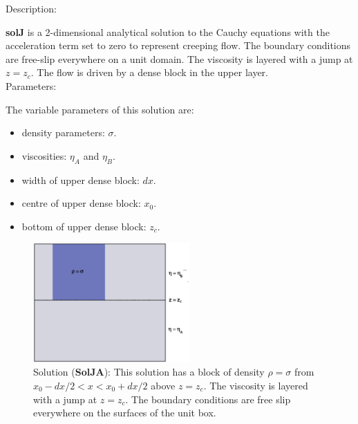   {\large \fontB Description:}
  
  {\bf solJ} is a 2-dimensional analytical solution to the Cauchy equations with the acceleration term set to zero
  to represent creeping flow. The boundary conditions are free-slip everywhere on a unit domain. 
  The viscosity is layered with a jump at $ z=z_c $.
  The flow is driven by a dense block in the upper layer.
  \\

  {\large \fontB Parameters:}
 
  The variable parameters of this solution are:
  \begin{itemize}
    \item{density parameters: $ \sigma $.}
    \item{viscosities: $\eta_A$ and $\eta_B$.}
    \item{width of upper dense block: $dx$.}
    \item{centre of upper dense block: $x_0$.}
    \item{bottom of upper dense block: $z_c$.}
    \end{itemize}

  \begin{figure}
    \includegraphics[width=6cm,clip]{../figs/figJA.eps}
    \caption[Short caption]{\label{figJA} 
      Solution ({\bf SolJA}):
      This solution has a block of density $\rho = \sigma$ from $x_{0}-dx/2 < x < x_{0}+dx/2$ above
      $ z= z_c$.
      The viscosity is layered with a jump at $ z=z_c $.
      The boundary conditions are free slip everywhere on the surfaces of the unit box.}
  \end{figure} 
  

